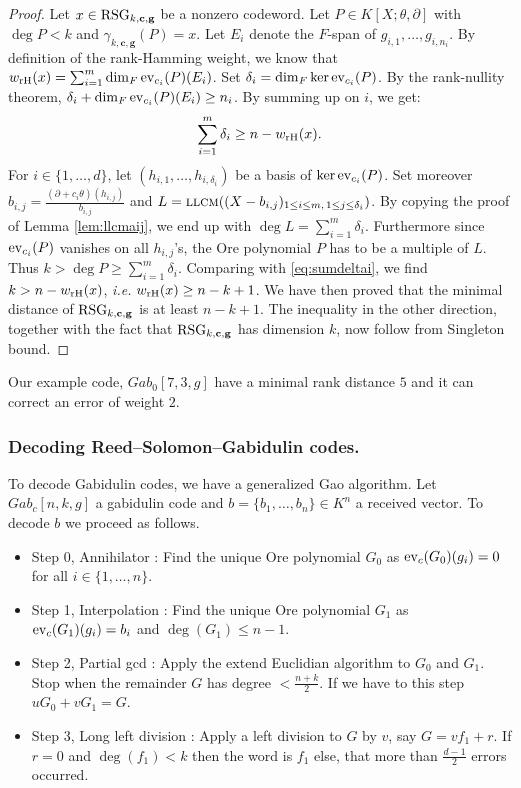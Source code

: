 \documentclass[a4paper]{llncs}
\newcommand{\ev}[1]{\textrm{\rm ev}_{#1}}
\newcommand{\llcm}{\textsc{llcm}}
\newcommand{\bc}{\textbf{c}}
\newcommand{\bg}{\textbf{g}}
\newcommand{\RSG}{\textrm{\rm RSG}}
\newcommand{\wrH}{w_{\textrm{\rm rH}}}
\begin{document}
\begin{proof}
Let $x \in \RSG_{k,\bc,\bg}$ be a nonzero codeword. Let $P \in 
K[X;\theta,\partial]$ with $\deg P < k$ and $\gamma_{k,\bc,\bg}(P) = x$.
Let $E_i$ denote the $F$-span of $g_{i,1}, \ldots, g_{i,n_i}$. By
definition of the rank-Hamming weight, we know that
$\wrH(x) = \sum_{i=1}^m \dim_F \ev{c_i}(P)(E_i)$.
Set $\delta_i = \dim_F \ker \ev{c_i}(P)$. By the rank-nullity
theorem, $\delta_i + \dim_F \ev{c_i}(P)(E_i) \geq n_i$. By summing
up on $i$, we get:
\begin{equation}
\label{eq:sumdeltai}
\sum_{i=1}^m \delta_i \geq n - \wrH(x).
\end{equation}
For $i \in \{1,\ldots,d\}$, let $(h_{i,1}, \ldots, h_{i,\delta_i})$
be a basis of $\ker \ev{c_i}(P)$. 
Set moreover $b_{i,j} = \frac{(\partial + c_i\theta)(h_{i,j})}{b_{i,j}}$
and $L = \llcm((X - b_{i,j})_{1 \leq i \leq m, \, 1 \leq j \leq \delta_i})$.
By copying the proof of Lemma \ref{lem:llcmaij}, we end up with
$\deg L = \sum_{i=1}^m \delta_i$. Furthermore since $\ev{c_i}(P)$
vanishes on all $h_{i,j}$'s, the Ore polynomial $P$ has to be a 
multiple of $L$. Thus $k > \deg P \geq \sum_{i=1}^m \delta_i$.
Comparing with \eqref{eq:sumdeltai}, we find $k > n - \wrH(x)$,
\emph{i.e.} $\wrH(x) \geq n - k + 1$.
We have then proved that the minimal distance of $\RSG_{k,\bc,\bg}$
is at least $n - k + 1$.
The inequality in the other direction, together with the fact that
$\RSG_{k,\bc,\bg}$ has dimension $k$, now follow from Singleton bound.
\end{proof}

\begin{example}
Our example code, $Gab_0[7,3,g]$ have a minimal rank distance $5$ and it can correct an error of weight $2$. 
\end{example}

\subsubsection*{Decoding Reed--Solomon--Gabidulin codes.}

To decode Gabidulin codes, we have a generalized Gao algorithm. Let $Gab_c[n,k,g]$ a gabidulin code and $b = \{b_1, \dots, b_n\} \in K^n$ a received vector. To decode $b$ we proceed as follows.

\begin{itemize}
\item Step 0, Annihilator : Find the unique Ore polynomial $G_0$ as $\ev{c}(G_0)(g_i) = 0$ for all $i \in \{1, \dots, n\}$.
\item Step 1, Interpolation : Find the unique Ore polynomial $G_1$ as $\ev{c}(G_1)(g_i) = b_i$ and $\deg(G_1) \leqslant n-1$.
\item Step 2, Partial gcd : Apply the extend Euclidian algorithm to $G_0$ and $G_1$. Stop when the remainder $G$ has degree $< \frac{n+k}{2}$. If we have to this step $uG_0 + vG_1 = G$.
\item Step 3, Long left division : Apply a left division to $G$ by $v$, say $G = vf_1 + r$. If $r =0$ and $\deg(f_1) < k$ then the word is $f_1$ else, that more than $\frac{d-1}{2}$ errors occurred. 
\end{itemize}
\end{document}
